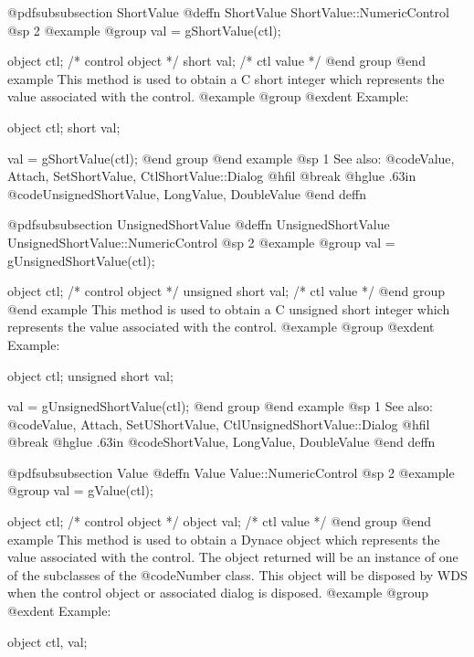 @pdfsubsubsection {ShortValue}
@deffn {ShortValue} ShortValue::NumericControl
@sp 2
@example
@group
val = gShortValue(ctl);

object  ctl;   /*  control object  */
short   val;   /*  ctl value       */
@end group
@end example
This method is used to obtain a C short integer which represents the
value associated with the control.  
@example
@group
@exdent Example:

object  ctl;
short   val;

val = gShortValue(ctl);
@end group
@end example
@sp 1
See also:  @code{Value, Attach, SetShortValue, CtlShortValue::Dialog}
@hfil @break @hglue .63in @code{UnsignedShortValue, LongValue, DoubleValue}
@end deffn











@pdfsubsubsection {UnsignedShortValue}
@deffn {UnsignedShortValue} UnsignedShortValue::NumericControl
@sp 2
@example
@group
val = gUnsignedShortValue(ctl);

object  ctl;           /*  control object  */
unsigned short  val;   /*  ctl value       */
@end group
@end example
This method is used to obtain a C unsigned short integer which represents the
value associated with the control.  
@example
@group
@exdent Example:

object  ctl;
unsigned short  val;

val = gUnsignedShortValue(ctl);
@end group
@end example
@sp 1
See also:  @code{Value, Attach, SetUShortValue, CtlUnsignedShortValue::Dialog}
@hfil @break @hglue .63in @code{ShortValue, LongValue, DoubleValue}
@end deffn










@pdfsubsubsection {Value}
@deffn {Value} Value::NumericControl
@sp 2
@example
@group
val = gValue(ctl);

object  ctl;   /*  control object  */
object  val;   /*  ctl value       */
@end group
@end example
This method is used to obtain a Dynace object which represents the value
associated with the control.  The object returned will be an instance of
one of the subclasses of the @code{Number} class.  This object will be
disposed by WDS when the control object or associated dialog is
disposed.
@example
@group
@exdent Example:

object  ctl, val;

